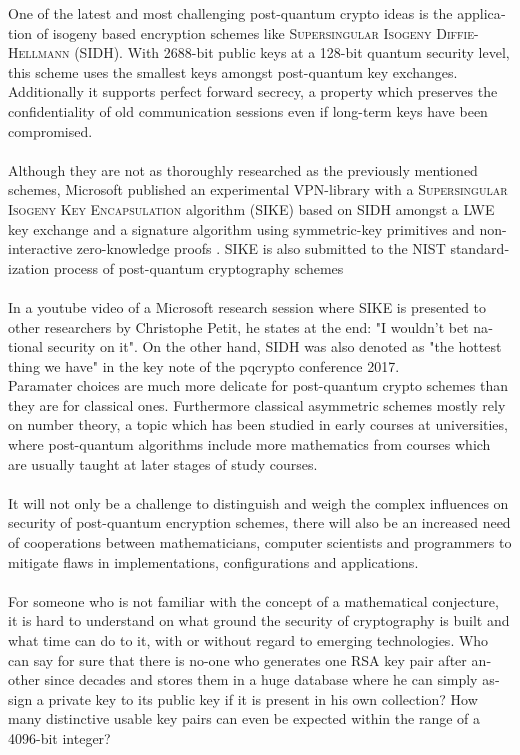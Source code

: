 \documentclass[a4paper,11pt]{article}
\begin{document}
\begin{otherlanguage}{english}
\begin{multicols}{2}
One of the latest and most challenging post-quantum crypto ideas is the application of isogeny based encryption schemes like \textsc{Supersingular Isogeny Diffie-Hellmann} (\textsc{SIDH}). With 2688-bit public keys at a 128-bit quantum security level, this scheme uses the smallest keys amongst post-quantum key exchanges. Additionally it supports perfect forward secrecy, a property which preserves the confidentiality of old communication sessions even if long-term keys have been compromised. \\
\\
Although they are not as thoroughly researched as the previously mentioned schemes, Microsoft published an experimental VPN-library with a \textsc{Supersingular Isogeny Key Encapsulation} algorithm (\textsc{SIKE}) based on \textsc{SIDH} amongst a \textsc{LWE} key exchange and a signature algorithm using symmetric-key primitives and non-interactive zero-knowledge proofs \cite{MSR}. \textsc{SIKE} is also submitted to the NIST standardization process of post-quantum cryptography schemes\\
\\
In a youtube video of a Microsoft research session where \textsc{SIKE} is presented to other researchers by Christophe Petit, he states at the end: "I wouldn't bet national security on it". On the other hand, \textsc{SIDH} was also denoted as "the hottest thing we have" in the key note of the pqcrypto conference 2017. \\

Paramater choices are much more delicate for post-quantum crypto schemes than they are for classical ones. Furthermore classical asymmetric schemes mostly rely on number theory, a topic which has been studied in early courses at universities, where post-quantum algorithms include more mathematics from courses which are usually taught at later stages of study courses. \\
\\
It will not only be a challenge to distinguish and weigh the complex influences on security of post-quantum encryption schemes, there will also be an increased need of cooperations between mathematicians, computer scientists and programmers to mitigate flaws in implementations, configurations and applications. \\
\\
For someone who is not familiar with the concept of a mathematical conjecture, it is hard to understand on what ground the security of cryptography is built and what time can do to it, with or without regard to emerging technologies. Who can say for sure that there is no-one who generates one RSA key pair after another since decades and stores them in a huge database where he can simply assign a private key to its public key if it is present in his own collection? How many distinctive usable key pairs can even be expected within the range of a 4096-bit integer? 


\end{multicols}
\end{otherlanguage}
\end{document}
